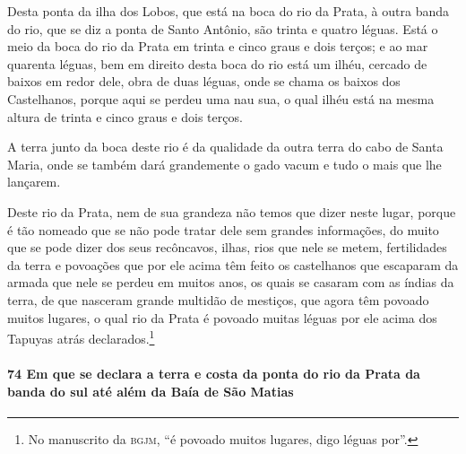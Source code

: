 Desta ponta da ilha dos Lobos, que está na boca do rio da Prata, à outra banda do rio, que
se diz a ponta de Santo Antônio, são trinta e quatro léguas. Está o meio da boca do rio da
Prata em trinta e cinco graus e dois terços; e ao mar quarenta léguas, bem em direito
desta boca do rio está um ilhéu, cercado de baixos em redor dele, obra de duas léguas,
onde se chama os baixos dos Castelhanos, porque aqui se perdeu uma nau sua, o qual ilhéu
está na mesma altura de trinta e cinco graus e dois terços.

A terra junto da boca deste rio é da qualidade da outra terra do cabo de Santa Maria, onde
se também dará grandemente o gado vacum e tudo o mais que lhe lançarem.

Deste rio da Prata, nem de sua grandeza não temos que dizer neste lugar, porque é tão
nomeado que se não pode tratar dele sem grandes informações, do muito que se pode dizer
dos seus recôncavos, ilhas, rios que nele se metem, fertilidades da terra e povoações que
por ele acima têm feito os castelhanos que escaparam da armada que nele se perdeu em
muitos anos, os quais se casaram com as índias da terra, de que nasceram grande multidão
de mestiços, que agora têm povoado muitos lugares, o qual rio da Prata é povoado muitas
léguas por ele acima dos Tapuyas atrás declarados.\footnote{ No manuscrito da
\textsc{bgjm}, ``é povoado muitos lugares, digo léguas por''.}

\paragraph{74 Em que se declara a terra e costa da ponta do rio da Prata da banda do sul
até além da Baía de São Matias}

